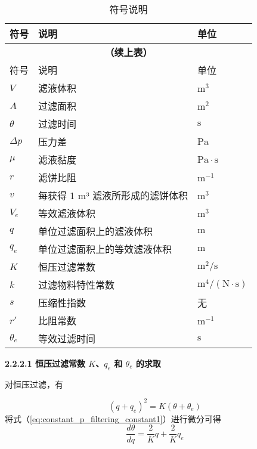 {
\centering
\settableinnerfont

\begin{longtable}[htbp]{p{3cm}p{8cm}p{3cm}}
    \caption{符号说明}
    \label{tab:symbols} \\

\toprule
    符号 & 说明 & 单位 \\
    \midrule
    \endfirsthead

\multicolumn{3}{c}{{\bfseries （续上表）}} \\
    \toprule
    符号 & 说明 & 单位 \\
    \midrule
    \endhead

\bottomrule
    \endfoot

\bottomrule
    \endlastfoot

\( V \) & 滤液体积 & \(\mathrm{m^3}\) \\
\( A \) & 过滤面积 & \(\mathrm{m^2}\) \\
\( \theta \) & 过滤时间 & \(\mathrm{s}\) \\
\( \Delta p \) & 压力差 & \(\mathrm{Pa}\) \\
\( \mu \) & 滤液黏度 & \(\mathrm{Pa \cdot s}\) \\
\( r \) & 滤饼比阻 & \(\mathrm{m^{-1}}\) \\
\( v \) & 每获得 1 m³ 滤液所形成的滤饼体积 & \(\mathrm{m^3}\) \\
\( V_e \) & 等效滤液体积 & \(\mathrm{m^3}\) \\
\( q \) & 单位过滤面积上的滤液体积 & \(\mathrm{m}\) \\
\( q_e \) & 单位过滤面积上的等效滤液体积 & \(\mathrm{m}\) \\
\( K \) & 恒压过滤常数 & \(\mathrm{m^2 / s}\) \\
\( k \) & 过滤物料特性常数 & \(\mathrm{m^4 / (N \cdot s)}\) \\
\( s \) & 压缩性指数 & 无 \\
\( r' \) & 比阻常数 & \(\mathrm{m^{-1}}\) \\
\( \theta_e \) & 等效过滤时间 & \(\mathrm{s}\) \\

\end{longtable}
}

{\noindent \wuhao \rmfamily {} \textbf{2.2.2.1 \quad 恒压过滤常数 $K$、$q_e$ 和 $\theta_e$ 的求取}}
\label{se:yuanli}

对恒压过滤，有

\begin{equation}
    (q + q_e)^2 = K (\theta + \theta_e)
    \label{eq:constant_p_filtering_constant1}
\end{equation}
将式（\ref{eq:constant_p_filtering_constant1}）进行微分可得
\begin{equation}
    \frac{d \theta}{d q} = \frac{2}{K} q + \frac{2}{K} q_e
    \label{eq:constant_p_filtering_constant2}
\end{equation}


